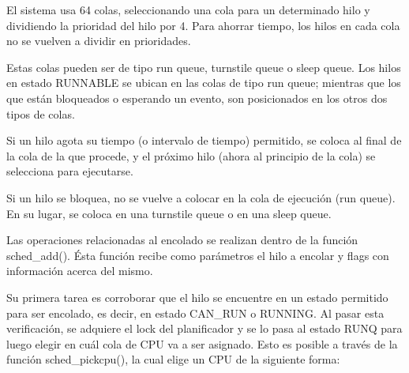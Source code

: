 





El sistema usa 64 colas, seleccionando una cola para un determinado hilo y dividiendo la prioridad del hilo por 4. Para ahorrar tiempo, los hilos en cada cola no se vuelven a dividir en prioridades.\par

Estas colas pueden ser de tipo run queue, turnstile queue o sleep queue. Los hilos en estado RUNNABLE se ubican en las colas de tipo run queue; mientras que los que están bloqueados o esperando un evento, son posicionados en los otros dos tipos de colas.\par

Si un hilo agota su tiempo (o intervalo de tiempo) permitido, se coloca al final de la cola de la que procede, y el próximo hilo (ahora al principio de la cola) se selecciona para ejecutarse.\par

Si un hilo se bloquea, no se vuelve a colocar en la cola de ejecución (run queue). En su lugar, se coloca en una turnstile queue o en una sleep queue.\par

Las operaciones relacionadas al encolado se realizan dentro de la función sched\_add(). Ésta función recibe como parámetros el hilo a encolar y flags con información acerca del mismo.\par

Su primera tarea es corroborar que el hilo se encuentre en un estado permitido para ser encolado, es decir, en estado CAN\_RUN o RUNNING. Al pasar esta verificación, se adquiere el lock del planificador y se lo pasa al estado RUNQ para luego elegir en cuál cola de CPU va a ser asignado. Esto es posible a través de la función sched\_pickcpu(), la cual elige un CPU de la siguiente forma:

